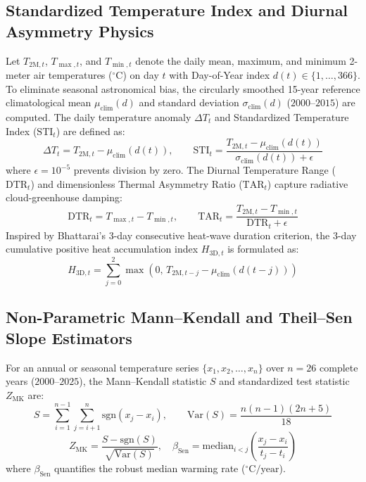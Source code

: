 \documentclass[conference]{IEEEtran}
\begin{document}
\subsection{Standardized Temperature Index and Diurnal Asymmetry Physics}
Let $T_{\text{2M}, t}$, $T_{\max, t}$, and $T_{\min, t}$ denote the daily mean, maximum, and minimum 2-meter air temperatures ($^\circ\text{C}$) on day $t$ with Day-of-Year index $d(t) \in \{1, \dots, 366\}$. To eliminate seasonal astronomical bias, the circularly smoothed 15-year reference climatological mean $\mu_{\text{clim}}(d)$ and standard deviation $\sigma_{\text{clim}}(d)$ ($2000\text{--}2015$) are computed. The daily temperature anomaly $\Delta T_t$ and Standardized Temperature Index ($\text{STI}_t$) are defined as:
\begin{equation}
\Delta T_t = T_{\text{2M}, t} - \mu_{\text{clim}}(d(t)), \qquad \text{STI}_t = \frac{T_{\text{2M}, t} - \mu_{\text{clim}}(d(t))}{\sigma_{\text{clim}}(d(t)) + \epsilon}
\label{eq:sti}
\end{equation}
where $\epsilon = 10^{-5}$ prevents division by zero. The Diurnal Temperature Range ($\text{DTR}_t$) and dimensionless Thermal Asymmetry Ratio ($\text{TAR}_t$) capture radiative cloud-greenhouse damping:
\begin{equation}
\text{DTR}_t = T_{\max, t} - T_{\min, t}, \qquad \text{TAR}_t = \frac{T_{\text{2M}, t} - T_{\min, t}}{\text{DTR}_t + \epsilon}
\label{eq:dtr_tar}
\end{equation}
Inspired by Bhattarai's \cite{bhattarai2022} 3-day consecutive heat-wave duration criterion, the 3-day cumulative positive heat accumulation index $H_{3\text{D}, t}$ is formulated as:
\begin{equation}
H_{3\text{D}, t} = \sum_{j=0}^{2} \max\left(0, \, T_{\text{2M}, t-j} - \mu_{\text{clim}}(d(t-j))\right)
\label{eq:heat_accum}
\end{equation}

\subsection{Non-Parametric Mann--Kendall and Theil--Sen Slope Estimators}
For an annual or seasonal temperature series $\{x_1, x_2, \dots, x_n\}$ over $n = 26$ complete years ($2000\text{--}2025$), the Mann--Kendall statistic $S$ \cite{mann1945, kendall1975} and standardized test statistic $Z_{\text{MK}}$ are:
\begin{equation}
S = \sum_{i=1}^{n-1} \sum_{j=i+1}^{n} \text{sgn}(x_j - x_i), \qquad \text{Var}(S) = \frac{n(n-1)(2n+5)}{18}
\label{eq:mk}
\end{equation}
\begin{equation}
Z_{\text{MK}} = \frac{S - \text{sgn}(S)}{\sqrt{\text{Var}(S)}}, \quad \beta_{\text{Sen}} = \text{median}_{i < j} \left( \frac{x_j - x_i}{t_j - t_i} \right)
\label{eq:sen}
\end{equation}
where $\beta_{\text{Sen}}$ quantifies the robust median warming rate ($^\circ\text{C/year}$).
\end{document}
